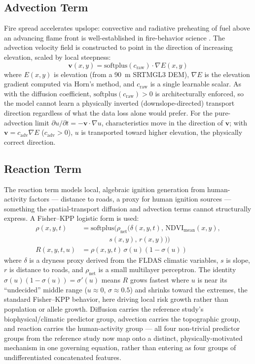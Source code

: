 \documentclass[journal]{IEEEtran}
\begin{document}
\subsection{Advection Term}
\label{sec:advection}

Fire spread accelerates upslope: convective and radiative preheating of fuel above an advancing flame front is well-established in fire-behavior science \cite{rothermel1972}. The advection velocity field is constructed to point in the direction of increasing elevation, scaled by local steepness:
\begin{equation}
\mathbf{v}(x,y) = \mathrm{softplus}(c_{\mathrm{raw}})\cdot \nabla E(x,y)
\label{eq:advection}
\end{equation}
where $E(x,y)$ is elevation (from a 90~m SRTMGL3 DEM), $\nabla E$ is the elevation gradient computed via Horn's method, and $c_{\mathrm{raw}}$ is a single learnable scalar. As with the diffusion coefficient, $\mathrm{softplus}(c_{\mathrm{raw}})>0$ is architecturally enforced, so the model cannot learn a physically inverted (downslope-directed) transport direction regardless of what the data loss alone would prefer. For the pure-advection limit $\partial u/\partial t = -\mathbf{v}\cdot\nabla u$, characteristics move in the direction of $\mathbf{v}$; with $\mathbf{v}=c_{\mathrm{adv}}\nabla E$ ($c_{\mathrm{adv}}>0$), $u$ is transported toward higher elevation, the physically correct direction.

\subsection{Reaction Term}
\label{sec:reaction}

The reaction term models local, algebraic ignition generation from human-activity factors --- distance to roads, a proxy for human ignition sources --- something the spatial-transport diffusion and advection terms cannot structurally express. A Fisher--KPP logistic form \cite{fisher1937,kpp1937} is used:
\begin{align}
\rho(x,y,t) &= \mathrm{softplus}\big(\rho_{\mathrm{net}}(\delta(x,y,t),\, \mathrm{NDVI}_{\mathrm{mean}}(x,y),\nonumber\\
&\qquad\qquad s(x,y),\, r(x,y))\big) \label{eq:rho}\\
R(x,y,t,u) &= \rho(x,y,t)\,\sigma(u)(1-\sigma(u)) \label{eq:reaction}
\end{align}
where $\delta$ is a dryness proxy derived from the FLDAS climatic variables, $s$ is slope, $r$ is distance to roads, and $\rho_{\mathrm{net}}$ is a small multilayer perceptron. The identity $\sigma(u)(1-\sigma(u))=\sigma'(u)$ means $R$ grows fastest where $u$ is near its ``undecided'' middle range ($u\approx0$, $\sigma\approx0.5$) and shrinks toward the extremes, the standard Fisher--KPP behavior, here driving local risk growth rather than population or allele growth. Diffusion carries the reference study's biophysical/climatic predictor group, advection carries the topographic group, and reaction carries the human-activity group --- all four non-trivial predictor groups from the reference study now map onto a distinct, physically-motivated mechanism in one governing equation, rather than entering as four groups of undifferentiated concatenated features.
\end{document}

